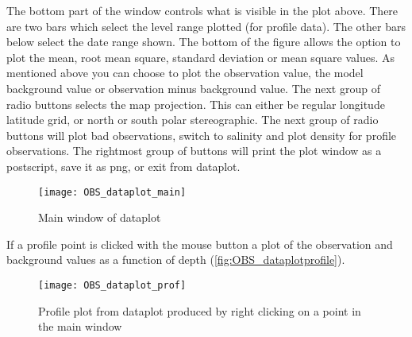 \documentclass[../main/NEMO_manual]{subfiles}
\begin{document}
The bottom part of the window controls what is visible in the plot above.
There are two bars which select the level range plotted (for profile data).
The other bars below select the date range shown.
The bottom of the figure allows the option to plot the mean, root mean square, standard deviation or
mean square values.
As mentioned above you can choose to plot the observation value, the model background value or
observation minus background value.
The next group of radio buttons selects the map projection.
This can either be regular longitude latitude grid, or north or south polar stereographic.
The next group of radio buttons will plot bad observations, switch to salinity and
plot density for profile observations.
The rightmost group of buttons will print the plot window as a postscript, save it as png, or exit from dataplot.

\begin{figure}
  \centering
  \texttt{[image: OBS\_dataplot\_main]}
  \caption{Main window of dataplot}
  \label{fig:OBS_dataplotmain}
\end{figure}

If a profile point is clicked with the mouse button a plot of the observation and background values as
a function of depth (\autoref{fig:OBS_dataplotprofile}).

\begin{figure}
  \centering
  \texttt{[image: OBS\_dataplot\_prof]}
  \caption[Profile plot from dataplot]{
    Profile plot from dataplot produced by right clicking on a point in the main window}
  \label{fig:OBS_dataplotprofile}
\end{figure}

\subinc{}
\end{document}
